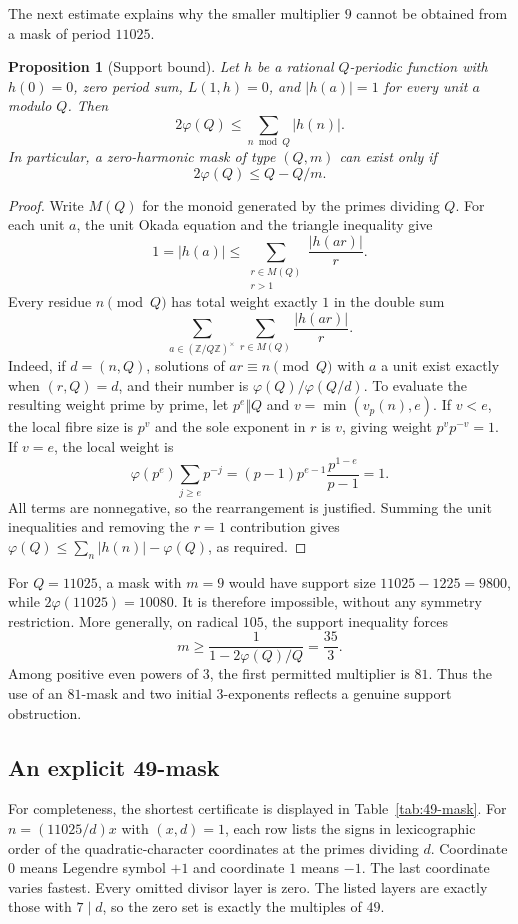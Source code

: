 \documentclass[11pt]{amsart}
\newtheorem{proposition}[theorem]{Proposition}
\theoremstyle{definition}
\theoremstyle{remark}
\numberwithin{equation}{section}
\begin{document}
The next estimate explains why the smaller multiplier $9$ cannot be obtained
from a mask of period $11025$.

\begin{proposition}[Support bound]
\label{prop:mask-support}
Let $h$ be a rational $Q$-periodic function with $h(0)=0$, zero period sum,
$L(1,h)=0$, and $|h(a)|=1$ for every unit $a$ modulo $Q$. Then
\[
 2\varphi(Q)\le\sum_{n\bmod Q}|h(n)|.
\]
In particular, a zero-harmonic mask of type $(Q,m)$ can exist only if
\[
 2\varphi(Q)\le Q-Q/m.
\]
\end{proposition}

\begin{proof}
Write $M(Q)$ for the monoid generated by the primes dividing $Q$.
For each unit $a$, the unit Okada equation and the triangle inequality give
\[
 1=|h(a)|\le
 \sum_{\substack{r\in M(Q)\\r>1}}\frac{|h(ar)|}{r}.
\]
Every residue $n\pmod Q$ has total weight exactly $1$ in the double sum
\[
 \sum_{a\in(\mathbb Z/Q\mathbb Z)^\times}
 \sum_{r\in M(Q)}\frac{|h(ar)|}{r}.
\]
Indeed, if $d=(n,Q)$, solutions of $ar\equiv n\pmod Q$ with $a$ a unit
exist exactly when $(r,Q)=d$, and their number is
$\varphi(Q)/\varphi(Q/d)$. To evaluate the resulting weight prime by
prime, let $p^e\Vert Q$ and $v=\min(v_p(n),e)$. If $v<e$, the local
fibre size is $p^v$ and the sole exponent in $r$ is $v$, giving weight
$p^vp^{-v}=1$. If $v=e$, the local weight is
\[
 \varphi(p^e)\sum_{j\ge e}p^{-j}
 =(p-1)p^{e-1}\frac{p^{1-e}}{p-1}=1.
\]
All terms are nonnegative, so the rearrangement is justified. Summing the
unit inequalities and removing the $r=1$ contribution gives
$\varphi(Q)\le\sum_n|h(n)|-\varphi(Q)$, as required.
\end{proof}

For $Q=11025$, a mask with $m=9$ would have support size
$11025-1225=9800$, while $2\varphi(11025)=10080$. It is therefore
impossible, without any symmetry restriction. More generally, on radical
$105$, the support inequality forces
\[
 m\ge\frac{1}{1-2\varphi(Q)/Q}=\frac{35}{3}.
\]
Among positive even powers of $3$, the first permitted multiplier is $81$.
Thus the use of an $81$-mask and two initial $3$-exponents reflects a genuine
support obstruction.

\subsection{An explicit 49-mask}
\label{subsec:49-mask-table}

For completeness, the shortest certificate is displayed in
Table~\ref{tab:49-mask}. For $n=(11025/d)x$ with $(x,d)=1$, each row lists
the signs in lexicographic order of the quadratic-character coordinates at
the primes dividing $d$. Coordinate $0$ means Legendre symbol $+1$ and
coordinate $1$ means $-1$. The last coordinate varies fastest. Every omitted
divisor layer is zero. The listed layers are exactly those with $7\mid d$,
so the zero set is exactly the multiples of $49$.
\end{document}

